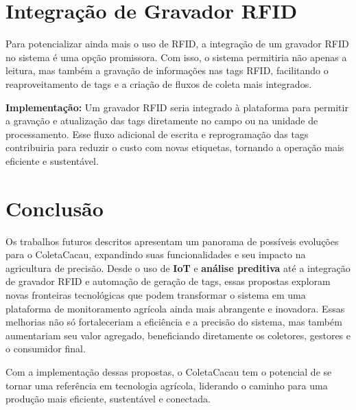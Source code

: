 \section{Integração de Gravador RFID}
Para potencializar ainda mais o uso de RFID, a integração de um gravador RFID no sistema é uma opção promissora. Com isso, o sistema permitiria não apenas a leitura, mas também a gravação de informações nas tags RFID, facilitando o reaproveitamento de tags e a criação de fluxos de coleta mais integrados.

\textbf{Implementação:} Um gravador RFID seria integrado à plataforma para permitir a gravação e atualização das tags diretamente no campo ou na unidade de processamento. Esse fluxo adicional de escrita e reprogramação das tags contribuiria para reduzir o custo com novas etiquetas, tornando a operação mais eficiente e sustentável.


\section{Conclusão}
Os trabalhos futuros descritos apresentam um panorama de possíveis evoluções para o ColetaCacau, expandindo suas funcionalidades e seu impacto na agricultura de precisão. Desde o uso de \textbf{IoT} e \textbf{análise preditiva} até a integração de gravador RFID e automação de geração de tags, essas propostas exploram novas fronteiras tecnológicas que podem transformar o sistema em uma plataforma de monitoramento agrícola ainda mais abrangente e inovadora. Essas melhorias não só fortaleceriam a eficiência e a precisão do sistema, mas também aumentariam seu valor agregado, beneficiando diretamente os coletores, gestores e o consumidor final.

Com a implementação dessas propostas, o ColetaCacau tem o potencial de se tornar uma referência em tecnologia agrícola, liderando o caminho para uma produção mais eficiente, sustentável e conectada.